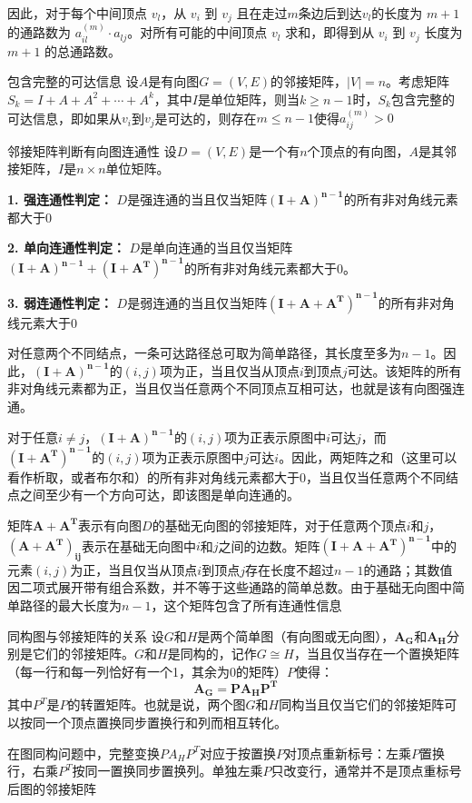 \documentclass[lang=cn,11pt]{elegantbook}
\begin{document}
因此，对于每个中间顶点 $v_l$，从 $v_i$ 到 $v_j$ 且在走过$m$条边后到达$v_l$的长度为 $m+1$ 的通路数为 $a_{il}^{(m)} \cdot a_{lj}$。对所有可能的中间顶点 $v_l$ 求和，即得到从 $v_i$ 到 $v_j$ 长度为 $m+1$ 的总通路数。
\begin{theorem}{包含完整的可达信息}
    设$A$是有向图$G=(V,E)$的邻接矩阵，$|V|=n$。考虑矩阵$S_k = I + A + A^2 + \cdots + A^k$，其中$I$是单位矩阵，则当$k \geqslant n-1$时，$S_k$包含完整的可达信息，即如果从$v_i$到$v_j$是可达的，则存在$m \leqslant n-1$使得$a_{ij}^{(m)} > 0$
\end{theorem}
\begin{theorem}{邻接矩阵判断有向图连通性}
设$D=(V,E)$是一个有$n$个顶点的有向图，$A$是其邻接矩阵，$I$是$n\times n$单位矩阵。

\textbf{1. 强连通性判定：}
$D$是强连通的当且仅当矩阵$\bm{(I+A)^{n-1}}$的所有非对角线元素都大于0

\textbf{2. 单向连通性判定：}
$D$是单向连通的当且仅当矩阵$\bm{(I+A)^{n-1} + (I+A^T)^{n-1}}$的所有非对角线元素都大于0。


\textbf{3. 弱连通性判定：}
$D$是弱连通的当且仅当矩阵$\bm{(I+A+A^T)^{n-1}}$的所有非对角线元素大于0
\end{theorem}
对任意两个不同结点，一条可达路径总可取为简单路径，其长度至多为$n-1$。因此，$\bm{(I+A)^{n-1}}$的$(i,j)$项为正，当且仅当从顶点$i$到顶点$j$可达。该矩阵的所有非对角线元素都为正，当且仅当任意两个不同顶点互相可达，也就是该有向图强连通。

对于任意$i \neq j$，$\bm{(I+A)^{n-1}}$的$(i,j)$项为正表示原图中$i$可达$j$，而$\bm{(I+A^T)^{n-1}}$的$(i,j)$项为正表示原图中$j$可达$i$。因此，两矩阵之和（这里可以看作析取，或者布尔和）的所有非对角线元素都大于0，当且仅当任意两个不同结点之间至少有一个方向可达，即该图是单向连通的。

矩阵$\bm{A+A^T}$表示有向图$D$的基础无向图的邻接矩阵，对于任意两个顶点$i$和$j$，$\bm{(A+A^T)_{ij}}$表示在基础无向图中$i$和$j$之间的边数。矩阵$\bm{(I+A+A^T)^{n-1}}$中的元素$(i,j)$为正，当且仅当从顶点$i$到顶点$j$存在长度不超过$n-1$的通路；其数值因二项式展开带有组合系数，并不等于这些通路的简单总数。由于基础无向图中简单路径的最大长度为$n-1$，这个矩阵包含了所有连通性信息
\begin{theorem}{同构图与邻接矩阵的关系}
设$G$和$H$是两个简单图（有向图或无向图），$\bm{A_G}$和$\bm{A_H}$分别是它们的邻接矩阵。$G$和$H$是同构的，记作$G \cong H$，当且仅当存在一个置换矩阵（每一行和每一列恰好有一个1，其余为0的矩阵）$P$使得：
\[
\bm{A_G = P A_H P^T}
\]
其中$P^T$是$P$的转置矩阵。也就是说，两个图$G$和$H$同构当且仅当它们的邻接矩阵可以按同一个顶点置换同步置换行和列而相互转化。
\end{theorem}
在图同构问题中，完整变换$PA_HP^T$对应于按置换$P$对顶点重新标号：左乘$P$置换行，右乘$P^T$按同一置换同步置换列。单独左乘$P$只改变行，通常并不是顶点重标号后图的邻接矩阵
\end{document}
